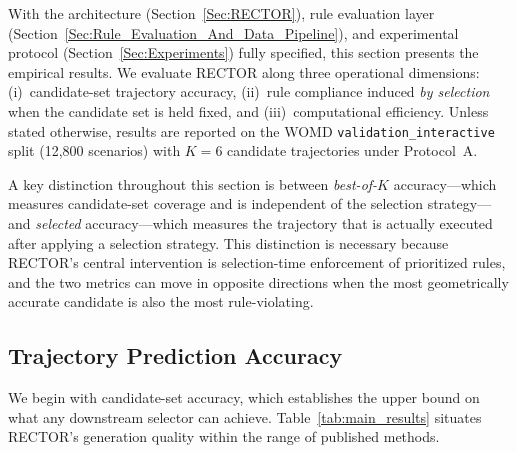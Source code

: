 With the architecture (Section~\ref{Sec:RECTOR}), rule evaluation layer (Section~\ref{Sec:Rule_Evaluation_And_Data_Pipeline}), and experimental protocol (Section~\ref{Sec:Experiments}) fully specified, this section presents the empirical results.  We evaluate RECTOR along three operational dimensions: (i)~candidate-set trajectory accuracy, (ii)~rule compliance induced \emph{by selection} when the candidate set is held fixed, and (iii)~computational efficiency.  Unless stated otherwise, results are reported on the WOMD \texttt{validation\_interactive} split (12{,}800 scenarios) with $K{=}6$ candidate trajectories under Protocol~A.

A key distinction throughout this section is between \emph{best-of-$K$} accuracy---which measures candidate-set coverage and is independent of the selection strategy---and \emph{selected} accuracy---which measures the trajectory that is actually executed after applying a selection strategy.  This distinction is necessary because RECTOR's central intervention is selection-time enforcement of prioritized rules, and the two metrics can move in opposite directions when the most geometrically accurate candidate is also the most rule-violating.

\subsection{Trajectory Prediction Accuracy}
\label{subsec:trajectory_accuracy}

We begin with candidate-set accuracy, which establishes the upper bound on what any downstream selector can achieve. Table~\ref{tab:main_results} situates RECTOR's generation quality within the range of published methods.

